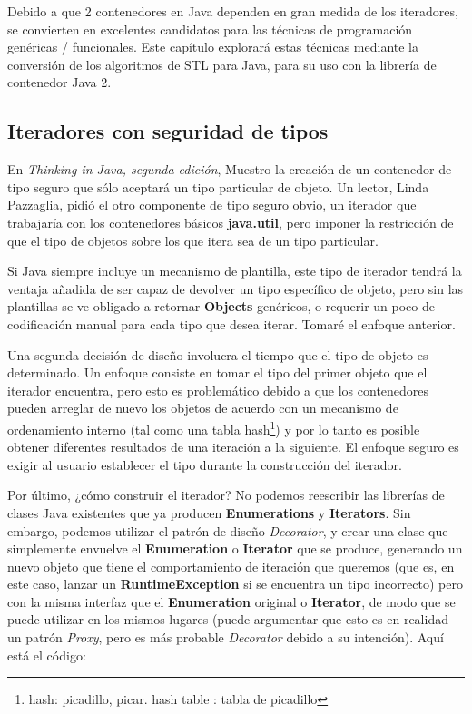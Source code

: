 \documentclass{article}
\begin{document}
Debido a que 2 contenedores en Java dependen en gran medida de los iteradores, se convierten en excelentes candidatos para las técnicas de programación genéricas / funcionales. Este capítulo explorará estas técnicas mediante la conversión de los algoritmos de STL para Java, para su uso con la librería de contenedor Java 2.  \newline

\subsection{Iteradores con seguridad de tipos}

En \textit{Thinking in Java, segunda edición}, Muestro la creación de un contenedor de tipo seguro que sólo aceptará un tipo particular de objeto. Un lector, Linda 
Pazzaglia, pidió el otro componente de tipo seguro obvio, un iterador que trabajaría con los contenedores básicos \textbf{java.util}, pero imponer la restricción de que el tipo de objetos sobre los que itera sea de un tipo particular. \newline

Si Java siempre incluye un mecanismo de plantilla, este tipo de iterador tendrá la ventaja añadida de ser capaz de devolver un tipo específico de objeto, pero sin las plantillas se ve obligado a retornar \textbf{Objects} genéricos, o requerir un poco de codificación manual para cada tipo que desea iterar. Tomaré el enfoque anterior.     \newline

Una segunda decisión de diseño involucra el tiempo que el tipo de objeto es determinado. Un enfoque consiste en tomar el tipo del primer objeto que el iterador encuentra, pero esto es problemático debido a que los contenedores pueden arreglar de nuevo los objetos de acuerdo con un mecanismo de ordenamiento interno (tal como una tabla hash\footnote{hash: picadillo, picar. \newline  hash table : tabla de picadillo}) y por lo tanto es posible obtener diferentes resultados de una iteración a la siguiente. El enfoque seguro es exigir al usuario establecer el tipo durante la construcción del iterador.     \newline

Por último, ¿cómo construir el iterador? No podemos reescribir las librerías de clases Java existentes que ya producen \textbf{Enumerations} y \textbf{Iterators}.  Sin embargo, podemos utilizar el patrón de diseño \textit{Decorator}, y crear una clase que simplemente envuelve el \textbf{Enumeration} o \textbf{Iterator} que se produce, generando un nuevo objeto que tiene el comportamiento de iteración que queremos (que es, en este caso, lanzar un \textbf{RuntimeException} si se encuentra un tipo incorrecto) pero con la misma interfaz que el \textbf{Enumeration} original o \textbf{Iterator}, de modo que se puede utilizar en los mismos lugares (puede argumentar que esto es en realidad un patrón \textit{Proxy}, pero es más probable \textit{Decorator} debido a su intención). Aquí está el código: \newline
\end{document}
